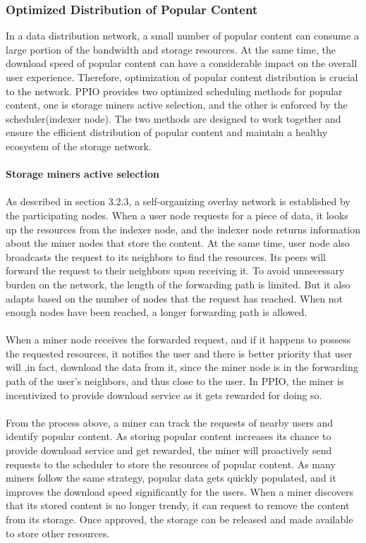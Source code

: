 \documentclass[10pt,a4paper]{article}
\begin{document}
         \subsubsection{Optimized Distribution of Popular Content}  %
In a data distribution network, a small number of popular content can consume a large portion of the bandwidth and storage resources. At the same time, the download speed of popular content can have a considerable impact on the overall user experience. Therefore, optimization of popular content distribution is crucial to the network. PPIO provides two optimized scheduling methods for popular content, one is storage miners active selection, and the other is enforced by the scheduler(indexer node). The two methods are designed to work together and ensure the efficient distribution of popular content and maintain a healthy ecosystem of the storage network.
\vspace{-0.5em}
\\ \\{\bf Storage miners active selection}
\vspace{-0.5em}
\\ \\As described in section 3.2.3, a self-organizing overlay network is established by the participating nodes. When a user node requests for a piece of data, it looks up the resources from the indexer node, and the indexer node returns information about the miner nodes that store the content. At the same time, user node also broadcasts the request to its neighbors to find the resources. Its peers will forward the request to their neighbors upon receiving it. To avoid unnecessary burden on the network, the length of the forwarding path is limited. But it also adapts based on the number of nodes that the request has reached. When not enough nodes have been reached, a longer forwarding path is allowed. 
\vspace{-0.5em}
\\ \\When a miner node receives the forwarded request, and if it happens to possess the requested resources, it notifies the user and there is better priority that user will ,in fact, download the data from it, since the miner node is in the forwarding path of the user’s neighbors, and thus close to the user. In PPIO, the miner is incentivized to provide download service as it gets rewarded for doing so.  
\vspace{-0.5em}
\\ \\From the process above, a miner can track the requests of nearby users and identify popular content. As storing popular content increases its chance to provide download service and get rewarded, the miner will proactively send requests to the scheduler to store the resources of popular content. As many miners follow the same strategy, popular data gets quickly populated, and it improves the download speed significantly for the users. When a miner discovers that its stored content is no longer trendy, it can request to remove the content from its storage. Once approved, the storage can be released and made available to store other resources.
\end{document}
